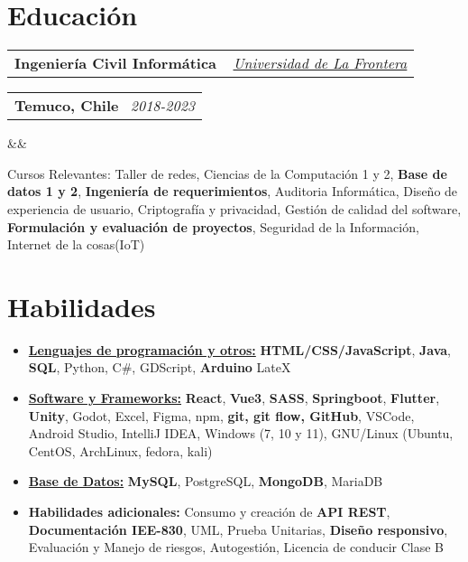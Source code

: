 \documentclass[11pt,a4paper,sans]{moderncv}
\makeatletter
\newcommand{\sectionMargin}{-3mm}
\newcommand*{\customcventry}[7][.13em]{
    \begin{tabular}{@{}l}
    {\bfseries #4} \
    {\itshape #3}
    \end{tabular}
    \hfill
    \begin{tabular}{l@{}}
    {\bfseries #5} \
    {\itshape #2}
    \end{tabular}
    \ifx&#7&%
    \else{\
    \begin{minipage}{\maincolumnwidth}%
    \small#7%
    \end{minipage}}\fi%
    \par\addvspace{#1}
}
\makeatother
\begin{document}
\section{Educación}{
    \customcventry
        {2018-2023}
        { \href{https://1drv.ms/b/c/13c8ae619d64655e/EV5lZJ1hrsgggBOHLAAAAAABHh9OZUbWLd2nx7PTa_OSsg?e=Fedmge}
        {\underline{Universidad de La Frontera}} }
        {Ingeniería Civil Informática}
        {Temuco, Chile}{}{}
        {Cursos Relevantes: 
            Taller de redes, 
            Ciencias de la Computación 1 y 2, 
            \textbf{Base de datos 1 y 2}, 
            \textbf{Ingeniería de requerimientos},
            Auditoria Informática, 
            Diseño de experiencia de usuario, 
            Criptografía y privacidad, 
            Gestión de calidad del software, 
            \textbf{Formulación y evaluación de proyectos},
            Seguridad de la Información,
            Internet de la cosas(IoT)
    }
}

\vspace*{\sectionMargin}

\section{Habilidades}{
    \begin{itemize}[label=\textbullet]
        \item {\underline{\textbf{Lenguajes de programación y otros:}}
            \textbf{HTML/CSS/JavaScript},
            \textbf{Java},
            \textbf{SQL},
            Python,
            C\#,
            GDScript,
            \textbf{Arduino}
            LateX
        }
        \item {\underline{\textbf{Software y Frameworks:}}
            \textbf{React},
            \textbf{Vue3},
            \textbf{SASS},
            \textbf{Springboot},
            \textbf{Flutter},
            \textbf{Unity},
            Godot,
            Excel, 
            Figma,
            npm,
            \textbf{git, git flow, GitHub},
            VSCode,
            Android Studio,
            IntelliJ IDEA,
            Windows (7, 10 y 11),
            GNU/Linux (Ubuntu, CentOS, ArchLinux, fedora, kali)
        }
        \item {\underline{\textbf{Base de Datos:}}
            \textbf{MySQL},
            PostgreSQL,
            \textbf{MongoDB},
            MariaDB
        }
        \item {\textbf{Habilidades adicionales:} 
            Consumo y creación de \textbf{API REST},
            \textbf{Documentación IEE-830},
            UML,
            Prueba Unitarias,
            \textbf{Diseño responsivo},
            Evaluación y Manejo de riesgos,  
            Autogestión, 
            Licencia de conducir Clase B
        }
    \end{itemize}
}
\end{document}
